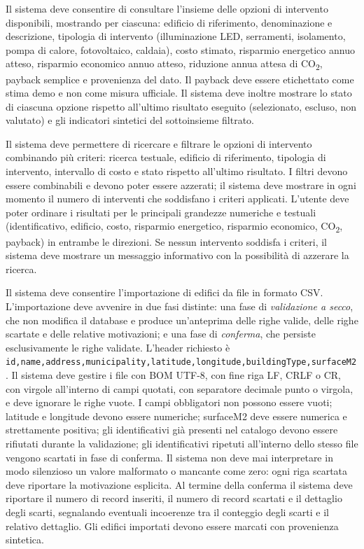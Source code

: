  \label{rf:catalogo_interventi}
Il sistema deve consentire di consultare l'insieme delle opzioni di intervento disponibili, mostrando per ciascuna: edificio di riferimento, denominazione e descrizione, tipologia di intervento (illuminazione LED, serramenti, isolamento, pompa di calore, fotovoltaico, caldaia), costo stimato, risparmio energetico annuo atteso, risparmio economico annuo atteso, riduzione annua attesa di CO\textsubscript{2}, payback semplice e provenienza del dato. Il payback deve essere etichettato come stima demo e non come misura ufficiale. Il sistema deve inoltre mostrare lo stato di ciascuna opzione rispetto all'ultimo risultato eseguito (selezionato, escluso, non valutato) e gli indicatori sintetici del sottoinsieme filtrato.

 \label{rf:filtri_interventi}
Il sistema deve permettere di ricercare e filtrare le opzioni di intervento combinando più criteri: ricerca testuale, edificio di riferimento, tipologia di intervento, intervallo di costo e stato rispetto all'ultimo risultato. I filtri devono essere combinabili e devono poter essere azzerati; il sistema deve mostrare in ogni momento il numero di interventi che soddisfano i criteri applicati. L'utente deve poter ordinare i risultati per le principali grandezze numeriche e testuali (identificativo, edificio, costo, risparmio energetico, risparmio economico, CO\textsubscript{2}, payback) in entrambe le direzioni. Se nessun intervento soddisfa i criteri, il sistema deve mostrare un messaggio informativo con la possibilità di azzerare la ricerca.

 \label{rf:import_csv}
Il sistema deve consentire l'importazione di edifici da file in formato CSV. L'importazione deve avvenire in due fasi distinte: una fase di \emph{validazione a secco}, che non modifica il database e produce un'anteprima delle righe valide, delle righe scartate e delle relative motivazioni; e una fase di \emph{conferma}, che persiste esclusivamente le righe validate. L'header richiesto è \texttt{id,name,address,municipality,latitude,longitude,buildingType,surfaceM2}. Il sistema deve gestire i file con BOM UTF-8, con fine riga LF, CRLF o CR, con virgole all'interno di campi quotati, con separatore decimale punto o virgola, e deve ignorare le righe vuote. I campi obbligatori non possono essere vuoti; latitude e longitude devono essere numeriche; surfaceM2 deve essere numerica e strettamente positiva; gli identificativi già presenti nel catalogo devono essere rifiutati durante la validazione; gli identificativi ripetuti all'interno dello stesso file vengono scartati in fase di conferma. Il sistema non deve mai interpretare in modo silenzioso un valore malformato o mancante come zero: ogni riga scartata deve riportare la motivazione esplicita. Al termine della conferma il sistema deve riportare il numero di record inseriti, il numero di record scartati e il dettaglio degli scarti, segnalando eventuali incoerenze tra il conteggio degli scarti e il relativo dettaglio. Gli edifici importati devono essere marcati con provenienza sintetica.

